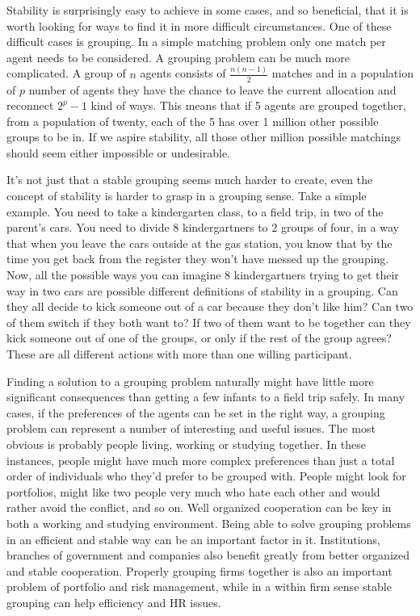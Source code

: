 \documentclass{elsarticle}
\begin{document}
Stability is surprisingly easy to achieve in some cases, and so beneficial, that it is worth looking for ways to find it in more difficult circumstances. One of these difficult cases is grouping. In a simple matching problem only one match per agent needs to be considered. A grouping problem can be much more complicated. A group of $n$ agents consists of $\frac{n(n-1)}{2}$ matches and in a population of $p$ number of agents they have the chance to leave the current allocation and reconnect $2^p-1$ kind of ways. This means that if 5 agents are grouped together, from a population of twenty, each of the 5 has over 1 million other possible groups to be in. If we aspire stability, all those other million possible matchings should seem either impossible or undesirable.

It's not just that a stable grouping seems much harder to create, even the concept of stability is harder to grasp in a grouping sense. Take a simple example. You need to take a kindergarten class, to a field trip, in two of the parent's cars. You need to divide 8 kindergartners to 2 groups of four, in a way that when you leave the cars outside at the gas station, you know that by the time you get back from the register they won't have messed up the grouping. Now, all the possible ways you can imagine 8 kindergartners trying to get their way in two cars are possible different definitions of stability in a grouping. Can they all decide to kick someone out of a car because they don't like him? Can two of them switch if they both want to? If two of them want to be together can they kick someone out of one of the groups, or only if the rest of the group agrees? These are all different actions with more than one willing participant.

Finding a solution to a grouping problem naturally might have little more significant consequences than getting a few infants to a field trip safely. In many cases, if the preferences of the agents can be set in the right way, a grouping problem can represent a number of  interesting and useful issues. The most obvious is probably people living, working or studying together. In these instances, people might have much more complex preferences than just a total order of individuals who they'd prefer to be grouped with. People might look for portfolios, might like two people very much who hate each other and would rather avoid the conflict, and so on. Well organized cooperation can be key in both a working and studying environment. Being able to solve grouping problems in an efficient and stable way can be an important factor in it. Institutions, branches of government and companies also benefit greatly from better organized and stable cooperation. Properly grouping firms together is also an important problem of portfolio and risk management, while in a within firm sense stable grouping can help efficiency and HR issues.
\end{document}
